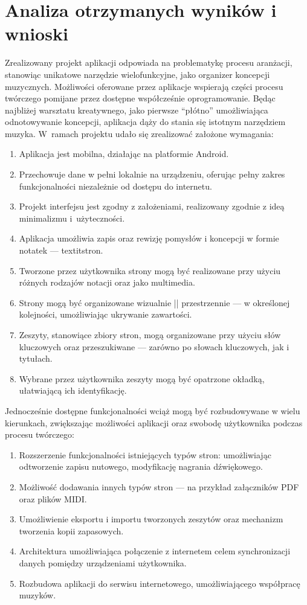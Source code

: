 \documentclass[12pt]{article}
\begin{document}
\section{Analiza otrzymanych wyników i wnioski}
Zrealizowany projekt aplikacji odpowiada na problematykę procesu aranżacji, stanowiąc unikatowe narzędzie wielofunkcyjne,
jako organizer koncepcji muzycznych. Możliwości oferowane przez aplikacje wspierają części procesu twórczego pomijane przez
dostępne współcześnie oprogramowanie. Będąc najbliżej warsztatu kreatywnego, jako pierwsze \enquote{płótno}
umożliwiająca odnotowywanie koncepcji, aplikacja dąży do stania się istotnym narzędziem muzyka.
W~ramach projektu udało się zrealizować założone wymagania:
\begin{enumerate}
	\item Aplikacja jest mobilna, działając na platformie Android.
	\item Przechowuje dane w pełni lokalnie na urządzeniu, oferując pełny zakres funkcjonalności niezależnie od dostępu do internetu.
	\item Projekt interfejsu jest zgodny z założeniami, realizowany zgodnie z ideą minimalizmu i~użyteczności.
	\item Aplikacja umożliwia zapis oraz rewizję pomysłów i koncepcji w formie notatek — textit{stron}.
	\item Tworzone przez użytkownika strony mogą być realizowane przy użyciu różnych rodzajów notacji oraz jako multimedia.
	\item Strony mogą być organizowane wizualnie || przestrzennie — w określonej kolejności, umożliwiając ukrywanie zawartości.
	\item Zeszyty, stanowiące zbiory stron, mogą organizowane przy użyciu słów kluczowych oraz przeszukiwane — zarówno po słowach kluczowych, jak i tytułach.
	\item Wybrane przez użytkownika zeszyty mogą być opatrzone okładką, ułatwiającą ich identyfikację.
\end{enumerate}

Jednocześnie dostępne funkcjonalności wciąż mogą być rozbudowywane w wielu kierunkach,
zwiększając możliwości aplikacji oraz swobodę użytkownika podczas procesu twórczego:
\begin{enumerate}
	\item Rozszerzenie funkcjonalności istniejących typów stron: umożliwiając odtworzenie zapisu nutowego, modyfikację nagrania dźwiękowego.
	\item Możliwość dodawania innych typów stron — na przykład załączników PDF oraz plików MIDI.
	\item Umożliwienie eksportu i importu tworzonych zeszytów oraz mechanizm tworzenia kopii zapasowych.
	\item Architektura umożliwiająca połączenie z internetem celem synchronizacji danych pomiędzy urządzeniami użytkownika.
	\item Rozbudowa aplikacji do serwisu internetowego, umożliwiającego współpracę muzyków.
\end{enumerate}
\end{document}
